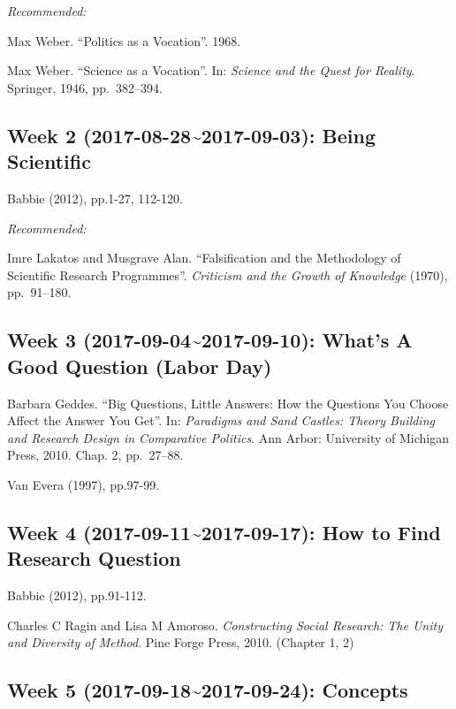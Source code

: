 \documentclass[11pt,]{article}
\begin{document}
\emph{Recommended:}

Max Weber. ``Politics as a Vocation''. 1968.

Max Weber. ``Science as a Vocation''. In:
\emph{Science and the Quest for Reality}. Springer, 1946, pp.~382--394.

\subsection{Week 2 (2017-08-28\textasciitilde{}2017-09-03): Being
Scientific}\label{week-2-2017-08-282017-09-03-being-scientific}

Babbie (2012), pp.1-27, 112-120.

\emph{Recommended:}

Imre Lakatos and Musgrave Alan. ``Falsification and the Methodology of
Scientific Research Programmes''.
\emph{Criticism and the Growth of Knowledge} (1970), pp.~91--180.

\subsection{Week 3 (2017-09-04\textasciitilde{}2017-09-10): What's A
Good Question (Labor
Day)}\label{week-3-2017-09-042017-09-10-whats-a-good-question-labor-day}

Barbara Geddes. ``Big Questions, Little Answers: How the Questions You
Choose Affect the Answer You Get''. In:
\emph{Paradigms and Sand Castles: Theory Building and Research Design in Comparative Politics}.
Ann Arbor: University of Michigan Press, 2010. Chap. 2, pp.~27--88.

Van Evera (1997), pp.97-99.

\subsection{Week 4 (2017-09-11\textasciitilde{}2017-09-17): How to Find
Research
Question}\label{week-4-2017-09-112017-09-17-how-to-find-research-question}

Babbie (2012), pp.91-112.

Charles C Ragin and Lisa M Amoroso.
\emph{Constructing Social Research: The Unity and Diversity of Method}.
Pine Forge Press, 2010. (Chapter 1, 2)

\subsection{Week 5 (2017-09-18\textasciitilde{}2017-09-24):
Concepts}\label{week-5-2017-09-182017-09-24-concepts}
\end{document}
